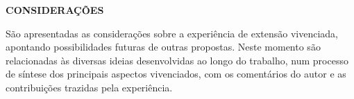 \begin{OnehalfSpace}
    \noindent\textbf{CONSIDERAÇÕES}

    São apresentadas as considerações sobre a experiência de extensão vivenciada, apontando possibilidades futuras de outras propostas. Neste momento são relacionadas às diversas ideias desenvolvidas ao longo do trabalho, num processo de síntese dos principais aspectos vivenciados, com os comentários do autor e as contribuições trazidas pela experiência.

\end{OnehalfSpace}